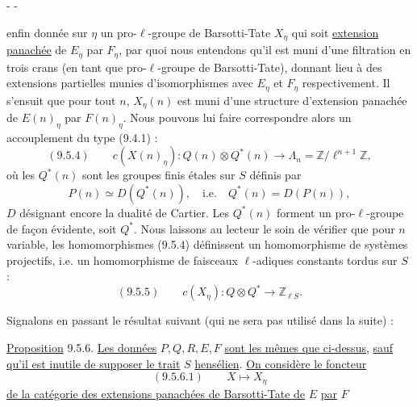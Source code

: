\begin{center}-  -\end{center}

enfin donnée sur $\eta$ un pro-$\ell$-groupe de Barsotti-Tate $X_\eta$ qui soit \uline{extension panachée} de $E_\eta$ par $F_\eta$, par quoi nous entendons qu'il est muni d'une filtration en trois crans (en tant que pro-$\ell$-groupe de Barsotti-Tate), donnant lieu à des extensions partielles munies d'isomorphismes avec $E_\eta$ et $F_\eta$ respectivement. Il s'ensuit que pour tout $n$, $X_\eta(n)$ est muni d'une structure d'extension panachée de $E(n)_\eta$ par $F(n)_\eta$. Nous pouvons lui faire correspondre alors un accouplement du type (9.4.1) :
\[
(9.5.4)\qquad c(X(n)_\eta):Q(n)\otimes Q^*(n)\longrightarrow\Lambda_n=\mathbb Z/\ell^{n+1}\mathbb Z,
\]
où les $Q^*(n)$ sont les groupes finis étales sur $S$ définis par
\[
P(n)\simeq D(Q^*(n)),\quad\text{i.e.}\quad Q^*(n)=D(P(n)),
\]
$D$ désignant encore la dualité de Cartier. Les $Q^*(n)$ forment un pro-$\ell$-groupe de façon évidente, soit $Q^*$. Nous laissons au lecteur le soin de vérifier que pour $n$ variable, les homomorphismes (9.5.4) définissent un homomorphisme de systèmes projectifs, i.e. un homomorphisme de faisceaux $\ell$-adiques constants tordus sur $S$ :
\[
(9.5.5)\qquad c(X_\eta):Q\otimes Q^*\longrightarrow\mathbb Z_{\ell S}.
\]

Signalons en passant le résultat suivant (qui ne sera pas utilisé dans la suite) :

\uline{Proposition} 9.5.6. \uline{Les données} $P,Q,R,E,F$ \uline{sont les mêmes que ci-dessus}, \uline{sauf qu'il est inutile de supposer le trait} $S$ \uline{hensélien}. \uline{On considère le foncteur}
\[
(9.5.6.1)\qquad X\longmapsto X_\eta
\]
\uline{de la catégorie des extensions panachées de Barsotti-Tate de} $E$ \uline{par} $F$

